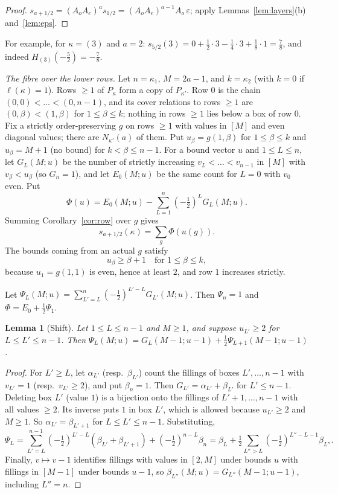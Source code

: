 \documentclass[11pt]{amsart}
\newtheorem{lemma}[theorem]{Lemma}
\theoremstyle{definition}
\theoremstyle{remark}
\begin{document}
\begin{proof}
$s_{a+1/2}=(A_oA_e)^as_{1/2}=(A_oA_e)^{a-1}A_o\,\varepsilon$; apply Lemmas~\ref{lem:layers}(b)
and~\ref{lem:eps}.
\end{proof}

For example, for $\kappa=(3)$ and $a=2$:
$s_{5/2}(3)=0+\tfrac12\cdot3-\tfrac14\cdot3+\tfrac18\cdot1=\tfrac78$, and indeed
$H_{(3)}(-\tfrac52)=-\tfrac78$.

\emph{The fibre over the lower rows.} Let $n=\kappa_1$, $M=2a-1$, and $k=\kappa_2$ (with $k=0$
if $\ell(\kappa)=1$). Rows $\ge1$ of $P_\kappa$ form a copy of $P_{\kappa'}$. Row $0$ is the
chain $(0,0)<\dots<(0,n-1)$, and its cover relations to rows $\ge1$ are $(0,\beta)<(1,\beta)$
for $1\le\beta\le k$; nothing in rows $\ge1$ lies below a box of row $0$. Fix a strictly
order-preserving $g$ on rows $\ge1$ with values in $[M]$ and even diagonal values; there are
$N_{\kappa'}(a)$ of them. Put $u_\beta=g(1,\beta)$ for $1\le\beta\le k$ and $u_\beta=M+1$ (no
bound) for $k<\beta\le n-1$. For a bound vector $u$ and $1\le L\le n$, let $G_L(M;u)$ be the
number of strictly increasing $v_L<\dots<v_{n-1}$ in $[M]$ with $v_\beta<u_\beta$ (so
$G_n=1$), and let $E_0(M;u)$ be the same count for $L=0$ with $v_0$ even. Put
\[ \Phi(u)=E_0(M;u)-\sum_{L=1}^n(-\tfrac12)^LG_L(M;u). \]
Summing Corollary~\ref{cor:row} over $g$ gives
\begin{equation}\label{eq:fibre}
s_{a+1/2}(\kappa)=\sum_g\Phi(u(g)).
\end{equation}
The bounds coming from an actual $g$ satisfy
\begin{equation}\tag{H}
u_\beta\ge\beta+1\quad\text{for }1\le\beta\le k,
\end{equation}
because $u_1=g(1,1)$ is even, hence at least $2$, and row $1$ increases strictly.

Let $\Psi_L(M;u)=\sum_{L'=L}^n(-\tfrac12)^{L'-L}G_{L'}(M;u)$. Then $\Psi_n=1$ and
$\Phi=E_0+\tfrac12\Psi_1$.

\begin{lemma}[Shift]\label{lem:shift}
Let $1\le L\le n-1$ and $M\ge1$, and suppose $u_{L'}\ge2$ for $L\le L'\le n-1$. Then
$\Psi_L(M;u)=G_L(M-1;u-1)+\tfrac12\Psi_{L+1}(M-1;u-1)$.
\end{lemma}

\begin{proof}
For $L'\ge L$, let $\alpha_{L'}$ (resp.\ $\beta_{L'}$) count the fillings of boxes
$L',\dots,n-1$ with $v_{L'}=1$ (resp.\ $v_{L'}\ge2$), and put $\beta_n=1$. Then
$G_{L'}=\alpha_{L'}+\beta_{L'}$ for $L'\le n-1$. Deleting box $L'$ (value $1$) is a bijection onto
the fillings of $L'+1,\dots,n-1$ with all values $\ge2$. Its inverse puts $1$ in box $L'$, which
is allowed because $u_{L'}\ge2$ and $M\ge1$. So $\alpha_{L'}=\beta_{L'+1}$ for $L\le L'\le n-1$.
Substituting,
\[ \Psi_L=\sum_{L'=L}^{n-1}(-\tfrac12)^{L'-L}(\beta_{L'}+\beta_{L'+1})+(-\tfrac12)^{n-L}\beta_n
=\beta_L+\tfrac12\sum_{L''>L}(-\tfrac12)^{L''-L-1}\beta_{L''}. \]
Finally, $v\mapsto v-1$ identifies fillings with values in $[2,M]$ under bounds $u$ with
fillings in $[M-1]$ under bounds $u-1$, so $\beta_{L''}(M;u)=G_{L''}(M-1;u-1)$, including
$L''=n$.
\end{proof}
\end{document}
